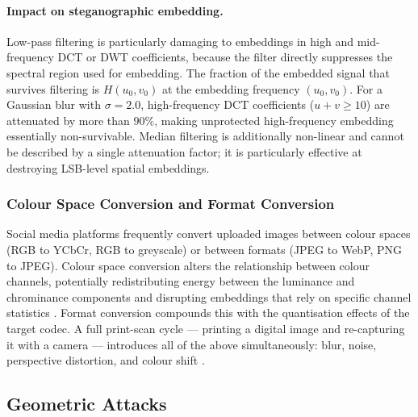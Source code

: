 \documentclass[12pt,a4paper,oneside]{report}
\begin{document}
	\paragraph{Impact on steganographic embedding.}
	Low-pass filtering is particularly damaging to embeddings in high and mid-frequency DCT or
	DWT coefficients, because the filter directly suppresses the spectral region used for embedding.
	The fraction of the embedded signal that survives filtering is $H(u_0, v_0)$ at the embedding
	frequency $(u_0, v_0)$. For a Gaussian blur with $\sigma = 2.0$, high-frequency DCT coefficients
	($u+v \geq 10$) are attenuated by more than $90\%$, making unprotected high-frequency embedding
	essentially non-survivable. Median filtering is additionally non-linear and cannot be described
	by a single attenuation factor; it is particularly effective at destroying LSB-level spatial
	embeddings.
	
	
	\subsubsection{Colour Space Conversion and Format Conversion}
	
	Social media platforms frequently convert uploaded images between colour spaces (RGB to
	YCbCr, RGB to greyscale) or between formats (JPEG to WebP, PNG to JPEG). Colour space
	conversion alters the relationship between colour channels, potentially redistributing energy
	between the luminance and chrominance components and disrupting embeddings that rely on
	specific channel statistics \cite{cox2007digital}. Format conversion compounds this with
	the quantisation effects of the target codec. A full print-scan cycle — printing a digital
	image and re-capturing it with a camera — introduces all of the above simultaneously: blur,
	noise, perspective distortion, and colour shift \cite{wengrowski2019light}.
	
	\subsection{Geometric Attacks}
	\label{subsec:geometric_attacks}
	
\end{document}
